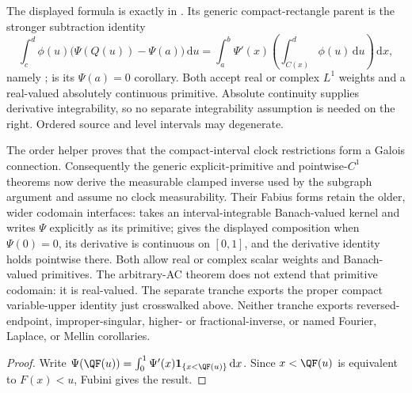 \documentclass[11pt,oneside]{article}
\theoremstyle{definition}
\theoremstyle{remark}
\newcommand{\dd}{\,\mathrm d}
\newcommand{\1}{\mathbf 1}
\begin{document}
\begin{statusbox}
The displayed formula is exactly
in .  Its generic compact-rectangle parent is the stronger
subtraction identity
\begin{equation}
 \int_c^d\phi(u)\bigl(\Psi(Q(u))-\Psi(a)\bigr)\dd u
 =\int_a^b\Psi'(x)\left(\int_{C(x)}^d\phi(u)\dd u\right)\dd x,
 \label{p8:eq:generic-ac-inverse-layercake}
\end{equation}
namely
;
is its \(\Psi(a)=0\) corollary.  Both accept real or complex \(L^1\) weights and a
real-valued absolutely continuous primitive.  Absolute continuity supplies derivative
integrability, so no separate integrability assumption is needed on the right.  Ordered
source and level intervals may degenerate.

The order helper  proves that
the compact-interval clock restrictions form a Galois connection.  Consequently the
generic explicit-primitive and pointwise-\(C^1\) theorems now derive the measurable
clamped inverse used by the subgraph argument and assume no clock measurability.  Their
Fabius forms retain the older, wider codomain interfaces:
 takes an
interval-integrable Banach-valued kernel and writes \(\Psi\) explicitly as its primitive;
 gives the displayed composition when
\(\Psi(0)=0\), its derivative is continuous on \([0,1]\), and the derivative identity
holds pointwise there.  Both allow real or complex scalar weights and Banach-valued
primitives.  The arbitrary-AC theorem does not extend that primitive codomain: it is
real-valued.  The separate  tranche exports the proper
compact variable-upper identity just crosswalked above.  Neither tranche exports
reversed-endpoint, improper-singular, higher- or fractional-inverse, or named Fourier,
Laplace, or Mellin corollaries.
\end{statusbox}

\begin{proof}
Write
\(\Psi(\QF(u))=\int_0^1\Psi'(x)\mathbf1_{\{x<\QF(u)\}}\dd x\).
Since \(x<\QF(u)\) is equivalent to \(F(x)<u\), Fubini gives the result.
\end{proof}
\end{document}
